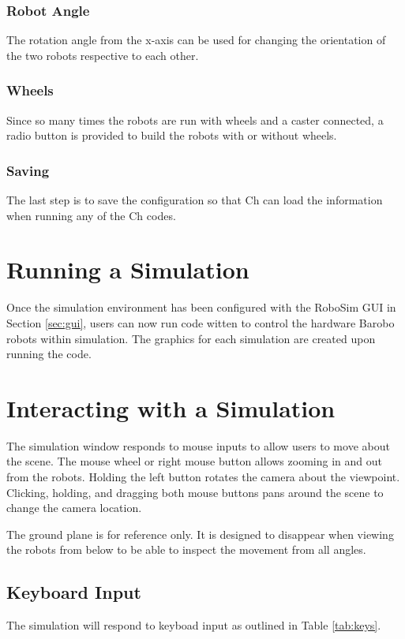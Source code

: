 \documentclass{article}
\begin{document}
\subsubsection{Robot Angle}
The rotation angle from the x-axis can be used for changing the orientation of the two robots
respective to each other. 

\subsubsection{Wheels}
Since so many times the robots are run with wheels and a caster connected, a radio button is provided
to build the robots with or without wheels.

\subsubsection{Saving}
The last step is to save the configuration so that Ch can load the information when running any
of the Ch codes.

\section{Running a Simulation}
Once the simulation environment has been configured with the RoboSim GUI in Section \ref{sec:gui}, users
can now run code witten to control the hardware Barobo robots within simulation.  The graphics for
each simulation are created upon running the code.

\section{Interacting with a Simulation}
The simulation window responds to mouse inputs to allow users to move about the scene.
The mouse wheel or right mouse button allows zooming in and out from the robots.  Holding the 
left button rotates the camera about the viewpoint.  Clicking, holding, and dragging both mouse
buttons pans around the scene to change the camera location.

The ground plane is for reference only.  It is designed to disappear when viewing the robots
from below to be able to inspect the movement from all angles.

\subsection{Keyboard Input}
The simulation will respond to keyboad input as outlined in Table \ref{tab:keys}.
\end{document}
